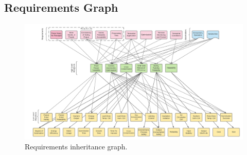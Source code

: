 \documentclass{../tex/report}
\begin{document}


\clearpage

\begin{appendices}
\section{Requirements Graph}

\begin{figure}[h]
  \centering
  \includegraphics[width=\textwidth,angle=90,origin=c]{../assets/figures/requirements.png}
  \caption{Requirements inheritance graph.}
  \label{fig:requirements-graph}
\end{figure}

\end{appendices}

\clearpage



\end{document}
